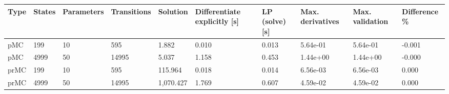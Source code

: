 \begin{tabular}{llllllllll}
\toprule
Type & States & Parameters & Transitions &  Solution & Differentiate explicitly [s] & LP (solve) [s] & Max. derivatives & Max. validation & Difference \% \\
\midrule
 pMC &    199 &         10 &         595 &     1.882 &                        0.010 &          0.013 &         5.64e-01 &        5.64e-01 &       -0.001 \\
 pMC &   4999 &         50 &       14995 &     5.037 &                        1.158 &          0.453 &         1.44e+00 &        1.44e+00 &       -0.000 \\
prMC &    199 &         10 &         595 &   115.964 &                        0.018 &          0.014 &         6.56e-03 &        6.56e-03 &        0.000 \\
prMC &   4999 &         50 &       14995 & 1,070.427 &                        1.769 &          0.607 &         4.59e-02 &        4.59e-02 &        0.000 \\
\bottomrule
\end{tabular}
